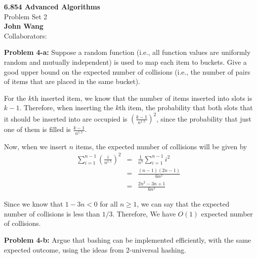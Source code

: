 \documentclass[psamsfonts]{amsart}
\newenvironment{sol}{\vspace{0.25cm}{\large \bfseries Solution:}}{\qedsymbol}
\newenvironment{prob}[1]{\begin{framed}{\large \bfseries Problem #1:}}{\end{framed}}
\newcommand{\makenewtitle}{
\begin{center}
{\huge \bfseries 6.854 Advanced Algorithms} \\
Problem Set 2\\
\vspace{0.25cm}
{\bfseries John Wang} \\
Collaborators:
\end{center}
\vspace{0.5cm}
}
\begin{document}
\newpage
\makenewtitle
\begin{prob}{4-a}
Suppose a random function (i.e., all function values are uniformly random and mutually independent) is used to map each item to buckets. Give a good upper bound on the expected number of collisions (i.e., the number of pairs of items that are placed in the same bucket).
\end{prob}
\begin{sol}
For the $k$th inserted item, we know that the number of items inserted into slots is $k-1$. Therefore, when inserting the $k$th item, the probability that both slots that it should be inserted into are occupied is $\left( \frac{k-1}{n^{1.5}} \right)^2$, since the probability that just one of them is filled is $\frac{k-1}{n^{1.5}}$. 

Now, when we insert $n$ items, the expected number of collisions will be given by
\begin{eqnarray}
\sum_{i=1}^{n-1} \left( \frac{i}{n^{1.5}} \right)^2 &=& \frac{1}{n^3} \sum_{i=1}^{n-1} i^2 \\
&=& \frac{(n-1)(2n-1)}{6n^2} \\
&=& \frac{2n^2 - 3n + 1}{6n^2}
\end{eqnarray}

Since we know that $1 - 3n < 0$ for all $n \geq 1$, we can say that the expected number of collisions is less than $1/3$. Therefore, We have $O(1)$ expected number of collisions.
\end{sol}

\begin{prob}{4-b}
Argue that bashing can be implemented efficiently, with the same expected outcome, using the ideas from 2-universal hashing.
\end{prob}
\end{document}
